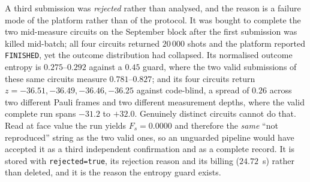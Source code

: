 \documentclass[aps,prxquantum,reprint,superscriptaddress]{revtex4-2}
\begin{document}
A third submission was \emph{rejected} rather than analysed, and the reason is a
failure mode of the platform rather than of the protocol. It was bought to
complete the two mid-measure circuits on the September block after the first
submission was killed mid-batch; all four circuits returned $20\,000$ shots and
the platform reported \texttt{FINISHED}, yet the outcome distribution had
collapsed. Its normalised outcome entropy is $0.275$--$0.292$ against a $0.45$
guard, where the two valid submissions of these same circuits measure
$0.781$--$0.827$; and its four circuits return $z=-36.51,-36.49,-36.46,-36.25$
against code-blind, a spread of $0.26$ across two different Pauli frames and two
different measurement depths, where the valid complete run spans $-31.2$ to
$+32.0$. Genuinely distinct circuits cannot do that. Read at face value the run
yields $F_s=0.0000$ and therefore the \emph{same} ``not reproduced'' string as the
two valid ones, so an unguarded pipeline would have accepted it as a third
independent confirmation and as a complete record. It is stored with
\texttt{rejected=true}, its rejection reason and its billing ($24.72$~s) rather
than deleted, and it is the reason the entropy guard exists.
\end{document}
